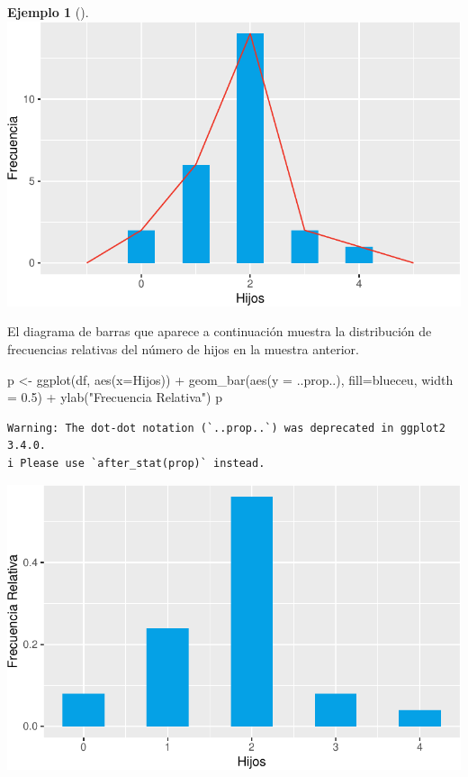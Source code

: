 \documentclass[
  a4paper,
]{scrreport}
\newenvironment{Shaded}{\begin{snugshade}}{\end{snugshade}}
\newcommand{\AttributeTok}[1]{\textcolor[rgb]{0.40,0.45,0.13}{#1}}
\newcommand{\FloatTok}[1]{\textcolor[rgb]{0.68,0.00,0.00}{#1}}
\newcommand{\FunctionTok}[1]{\textcolor[rgb]{0.28,0.35,0.67}{#1}}
\newcommand{\NormalTok}[1]{\textcolor[rgb]{0.00,0.23,0.31}{#1}}
\newcommand{\OtherTok}[1]{\textcolor[rgb]{0.00,0.23,0.31}{#1}}
\newcommand{\SpecialCharTok}[1]{\textcolor[rgb]{0.37,0.37,0.37}{#1}}
\newcommand{\StringTok}[1]{\textcolor[rgb]{0.13,0.47,0.30}{#1}}
\theoremstyle{plain}
\theoremstyle{definition}
\newtheorem{example}{Ejemplo}[chapter]
\theoremstyle{definition}
\theoremstyle{remark}
\begin{document}
\begin{example}[]
\includegraphics{02-estadistica-descriptiva_files/figure-pdf/poligono-frecuencias-absolutas-1.pdf}

El diagrama de barras que aparece a continuación muestra la distribución
de frecuencias relativas del número de hijos en la muestra anterior.

\begin{Shaded}
\begin{Highlighting}[]
\NormalTok{p }\OtherTok{\textless{}{-}} \FunctionTok{ggplot}\NormalTok{(df, }\FunctionTok{aes}\NormalTok{(}\AttributeTok{x=}\NormalTok{Hijos)) }\SpecialCharTok{+} 
    \FunctionTok{geom\_bar}\NormalTok{(}\FunctionTok{aes}\NormalTok{(}\AttributeTok{y =}\NormalTok{ ..prop..), }\AttributeTok{fill=}\NormalTok{blueceu, }\AttributeTok{width =} \FloatTok{0.5}\NormalTok{) }\SpecialCharTok{+}
    \FunctionTok{ylab}\NormalTok{(}\StringTok{"Frecuencia Relativa"}\NormalTok{)}
\NormalTok{p}
\end{Highlighting}
\end{Shaded}

\begin{verbatim}
Warning: The dot-dot notation (`..prop..`) was deprecated in ggplot2 3.4.0.
i Please use `after_stat(prop)` instead.
\end{verbatim}

\includegraphics{02-estadistica-descriptiva_files/figure-pdf/diagrama-barras-relativas-1.pdf}


\end{example}
\end{document}

